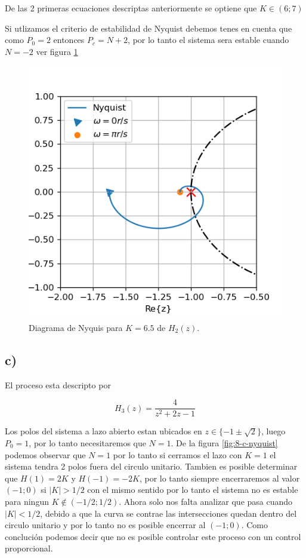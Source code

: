 \documentclass{article}
\begin{document}
            De las 2 primeras ecuaciones descriptas anteriormente se optiene que $K\in(6;7)$

            Si utlizamos el criterio de estabilidad de Nyquist debemos tenes en cuenta que como $P_0=2$ entonces $P_c=N + 2$, por lo tanto el 
            sistema sera estable cuando $N=-2$ ver figura \ref{fig:8-b-nyquist}

            \begin{figure}[!htb]
                \centering
                \includegraphics[width=.4\textwidth]{Img/8-b-nyquist}
                \caption{Diagrama de Nyquis para $K=6.5$ de $H_2(z)$.}
                \label{fig:8-b-nyquist}
            \end{figure}

        \subsection{c)}

        El proceso esta descripto por 

        \begin{equation}
            H_3(z) = \frac{4}{z^2 + 2z -1}
        \end{equation}

        Los polos del sistema a lazo abierto estan ubicados en $z \in \{ -1 \pm \sqrt{2}  \}$, luego $P_0=1$, por lo 
        tanto necesitaremos que $N=1$. De la figura \ref{fig:8-c-nyquist} podemos observar que $N=1$ por lo tanto si 
        cerramos el lazo con $K=1$ el sistema tendra 2 polos fuera del circulo unitario. Tambien es posible determinar 
        que $H(1) = 2K$ y $H(-1)=-2K$, por lo tanto siempre encerraremos al valor $(-1;0)$ si $|K|>1/2$ con el mismo sentido 
        por lo tanto el sistema no es estable para ningun $K \notin (-1/2 ; 1/2)$. Ahora solo nos falta analizar que 
        pasa cuando $|K|<1/2$, debido a que la curva se contrae las intersecciones quedan dentro del circulo unitario 
        y por lo tanto no es posible encerrar al $(-1;0)$. Como conclución podemos decir que no es posible controlar 
        este proceso con un control proporcional.
\end{document}
